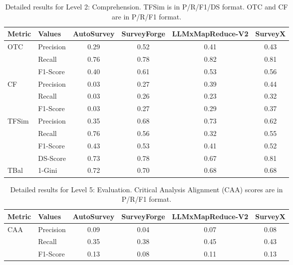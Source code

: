 \documentclass[11pt]{article}
\begin{document}
\begin{table}[h!]
    \centering
    \caption{Detailed results for Level 2: Comprehension. TFSim is in P/R/F1/DS format. OTC and CF are in P/R/F1 format.}
    \label{tab:appendix_level2}
    \begin{tabular}{llcccc}
        \toprule
        \textbf{Metric} & \textbf{Values} & \textbf{AutoSurvey} & \textbf{SurveyForge} & \textbf{LLMxMapReduce-V2} & \textbf{SurveyX} \\
        \midrule
        \multirow{3}{*}{OTC} 
            & Precision & 0.29 & 0.52 & 0.41 & 0.43 \\
            & Recall    & 0.76 & 0.78 & 0.82 & 0.81 \\
            & F1-Score  & 0.40 & 0.61 & 0.53 & 0.56 \\
        \midrule
        \multirow{3}{*}{CF} 
            & Precision & 0.03 & 0.27 & 0.39 & 0.44 \\
            & Recall    & 0.03 & 0.26 & 0.23 & 0.32 \\
            & F1-Score  & 0.03 & 0.27 & 0.29 & 0.37 \\
        \midrule
        \multirow{4}{*}{TFSim} 
            & Precision & 0.35 & 0.68 & 0.73 & 0.62 \\
            & Recall    & 0.76 & 0.56 & 0.32 & 0.55 \\
            & F1-Score  & 0.43 & 0.53 & 0.41 & 0.52 \\
            & DS-Score  & 0.73 & 0.78 & 0.67 & 0.81 \\
        \midrule
        TBal & 1-Gini & 0.72 & 0.70 & 0.68 & 0.68 \\
        \bottomrule
    \end{tabular}
\end{table}

\begin{table}[h!]
    \centering
    \caption{Detailed results for Level 5: Evaluation. Critical Analysis Alignment (CAA) scores are in P/R/F1 format.}
    \label{tab:appendix_level5}
    \begin{tabular}{llcccc}
        \toprule
        \textbf{Metric} & \textbf{Values} & \textbf{AutoSurvey} & \textbf{SurveyForge} & \textbf{LLMxMapReduce-V2} & \textbf{SurveyX} \\
        \midrule
        \multirow{3}{*}{CAA} 
            & Precision & 0.09 & 0.04 & 0.07 & 0.08 \\ 
            & Recall    & 0.35 & 0.38 & 0.45 & 0.43 \\ 
            & F1-Score  & 0.13 & 0.08 & 0.11 & 0.13 \\
        \bottomrule
    \end{tabular}
\end{table}
\end{document}
